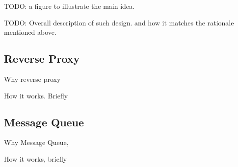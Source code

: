 TODO: a figure to illustrate the main idea.

TODO: Overall description of such design. and how it matches the rationale mentioned above.


\subsection{Reverse Proxy\\}

Why reverse proxy

How it works. Briefly

\subsection{Message Queue\\}

Why Message Queue, 

How it works, briefly


